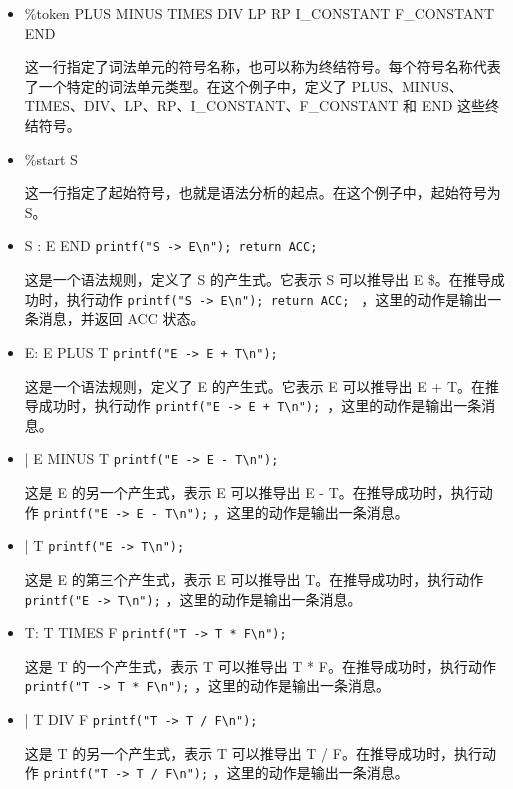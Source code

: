 \documentclass[lang=cn,11pt,a4paper]{elegantpaper}
\begin{document}
\begin{itemize}
    \item \%token PLUS MINUS TIMES DIV LP RP I\_CONSTANT F\_CONSTANT END
    
    这一行指定了词法单元的符号名称，也可以称为终结符号。每个符号名称代表了一个特定的词法单元类型。在这个例子中，定义了 PLUS、MINUS、TIMES、DIV、LP、RP、I\_CONSTANT、F\_CONSTANT 和 END 这些终结符号。
    
    \item \%start S
    
    这一行指定了起始符号，也就是语法分析的起点。在这个例子中，起始符号为 S。
    \item S : E END { \lstinline{printf("S -> E\n"); return ACC; }}
    
    这是一个语法规则，定义了 S 的产生式。它表示 S 可以推导出 E \$。在推导成功时，执行动作 { \lstinline{printf("S -> E\n"); return ACC; } }，这里的动作是输出一条消息，并返回 ACC 状态。
    
    \item E: E PLUS T { \lstinline{printf("E -> E + T\n"); }}
    
    这是一个语法规则，定义了 E 的产生式。它表示 E 可以推导出 E + T。在推导成功时，执行动作 { \lstinline{printf("E -> E + T\n"); }}，这里的动作是输出一条消息。
    
    \item | E MINUS T { \lstinline{printf("E -> E - T\n");} }
    
    这是 E 的另一个产生式，表示 E 可以推导出 E - T。在推导成功时，执行动作 { \lstinline{printf("E -> E - T\n");} }，这里的动作是输出一条消息。
    
    \item | T { \lstinline{printf("E -> T\n");} }
    
    这是 E 的第三个产生式，表示 E 可以推导出 T。在推导成功时，执行动作 { \lstinline{printf("E -> T\n");} }，这里的动作是输出一条消息。
    
    \item T: T TIMES F { \lstinline{printf("T -> T * F\n");} }
    
    这是 T 的一个产生式，表示 T 可以推导出 T * F。在推导成功时，执行动作 { \lstinline{printf("T -> T * F\n");} }，这里的动作是输出一条消息。
    
    \item | T DIV F { \lstinline{printf("T -> T / F\n");} }
    
    这是 T 的另一个产生式，表示 T 可以推导出 T / F。在推导成功时，执行动作 {\lstinline{printf("T -> T / F\n");}  }，这里的动作是输出一条消息。
    

\end{itemize}
\end{document}
